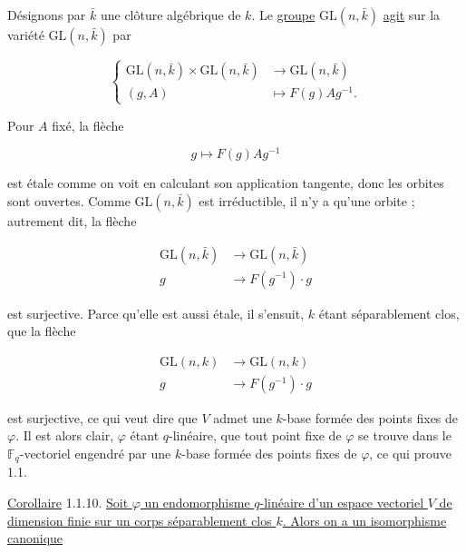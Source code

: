 Désignons par $\bar k$ une clôture algébrique de $k$. Le
\underline{groupe} $\mathrm{GL}(n,\bar k)$ \underline{agit} sur la variété
$\mathrm{GL}(n,\bar k)$ par

\begin{equation}\tag{1.1.6}
\left\{
\begin{aligned}
\mathrm{GL}(n,\bar k)\times\mathrm{GL}(n,\bar k)
&\longrightarrow\mathrm{GL}(n,\bar k)\\
(g,A)&\longmapsto F(g)Ag^{-1}.
\end{aligned}
\right.
\end{equation}

Pour $A$ fixé, la flèche

\begin{equation}\tag{1.1.7}
g\longmapsto F(g)Ag^{-1}
\end{equation}

est étale comme on voit en calculant son application tangente, donc les
orbites sont ouvertes. Comme $\mathrm{GL}(n,\bar k)$ est irréductible, il n'y
a qu'une orbite ; autrement dit, la flèche

\begin{equation}\tag{1.1.8}
\begin{aligned}
\mathrm{GL}(n,\bar k)&\longrightarrow\mathrm{GL}(n,\bar k)\\
g&\longrightarrow F(g^{-1})\cdot g
\end{aligned}
\end{equation}


est surjective. Parce qu'elle est aussi étale, il s'ensuit, $k$ étant
séparablement clos, que la flèche

\begin{equation}\tag{1.1.9}
\begin{aligned}
\mathrm{GL}(n,k)&\longrightarrow\mathrm{GL}(n,k)\\
g&\longrightarrow F(g^{-1})\cdot g
\end{aligned}
\end{equation}

est surjective, ce qui veut dire que $V$ admet une $k$-base formée des points
fixes de $\varphi$. Il est alors clair, $\varphi$ étant $q$-linéaire, que tout
point fixe de $\varphi$ se trouve dans le $\mathbb F_q$-vectoriel engendré par
une $k$-base formée des points fixes de $\varphi$, ce qui prouve 1.1.

\underline{Corollaire} 1.1.10. \underline{Soit $\varphi$ un endomorphisme
$q$-linéaire d'un espace vectoriel $V$ de dimension finie sur un corps
séparablement clos $k$. Alors on a un isomorphisme canonique}

